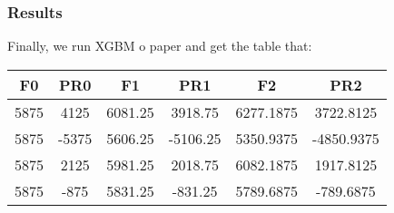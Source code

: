 \documentclass[a4paper,12pt]{journal}
\begin{document}
	\subsubsection*{Results}
	Finally, we run XGBM o paper and get the table that:
	\begin{center}
		\begin{tabular}{|c|c|c|c|c|c|}
			\hline
			F0&PR0&F1&PR1&F2&PR2\\\hline
			5875&4125&6081.25&3918.75&6277.1875&3722.8125\\\hline
			5875&-5375&5606.25&-5106.25&5350.9375&-4850.9375\\\hline
			5875&2125&5981.25&2018.75&6082.1875& 1917.8125\\\hline
			5875&-875&5831.25&-831.25&5789.6875&-789.6875\\\hline
		\end{tabular}
	\end{center}
\end{document}
